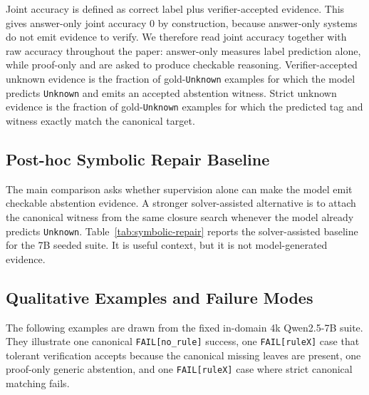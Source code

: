 Joint accuracy is defined as correct label plus verifier-accepted evidence. This
gives answer-only joint accuracy 0 by construction, because answer-only systems
do not emit evidence to verify. We therefore read joint accuracy together with
raw accuracy throughout the paper: answer-only measures label prediction alone,
while proof-only and \model{} are asked to produce checkable reasoning.
Verifier-accepted unknown evidence is the fraction of gold-\texttt{Unknown}
examples for which the model predicts \texttt{Unknown} and emits an accepted
abstention witness. Strict unknown evidence is the fraction of
gold-\texttt{Unknown} examples for which the predicted tag and witness exactly
match the canonical target.

\subsection{Post-hoc Symbolic Repair Baseline}

The main comparison asks whether supervision alone can make the model emit
checkable abstention evidence. A stronger solver-assisted alternative is to
attach the canonical witness from the same closure search whenever the model
already predicts \texttt{Unknown}. Table~\ref{tab:symbolic-repair} reports the
solver-assisted baseline for the 7B seeded suite. It is useful context, but it
is not model-generated evidence.

\begin{table}[t]
\centering
\small

\caption{Solver-assisted repair under fixed model labels on the fixed 7B seeded
suite. This is not model-generated evidence: the repaired column preserves the
model's predicted labels, attaches canonical witnesses only after the model
predicts \texttt{Unknown}, and therefore contextualizes solver-assisted
test-time repair rather than replacing the main supervision-only comparison.
Rows report 3-seed means.}
\label{tab:symbolic-repair}
\end{table}

\subsection{Qualitative Examples and Failure Modes}

The following examples are drawn from the fixed in-domain 4k Qwen2.5-7B suite.
They illustrate one canonical \texttt{FAIL[no\_rule]} success, one
\texttt{FAIL[ruleX]} case that tolerant verification accepts because the
canonical missing leaves are present, one proof-only generic abstention, and
one \texttt{FAIL[ruleX]} case where strict canonical matching fails.

